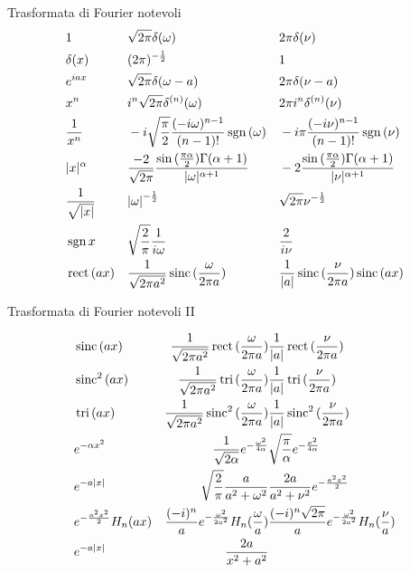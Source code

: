 \documentclass[asd-beamer.tex]{subfiles}
\begin{document}
\begin{wordonframe}{Trasformata di Fourier notevoli}
\begin{align*}
& 1 & &\sqrt{2\pi}\delta(\omega) & &2\pi\delta(\nu)\\
& \delta(x) & &(2\pi)^{-\frac{1}{2}} & &1\\
& e^{iax} & &\sqrt{2\pi}\delta(\omega-a) & &2\pi\delta(\nu-a)\\
& x^n & &i^n\sqrt{2\pi}\delta^{(n)}(\omega) & &2\pi i^n\delta^{(n)}(\nu)\\
& \frac{1}{x^n} & &-i\sqrt{\frac{\pi}{2}}\frac{(-i\omega)^{n-1}}{(n-1)!}\operatorname{sgn}{(\omega)} & &-i\pi\frac{(-i\nu)^{n-1}}{(n-1)!}\operatorname{sgn}{(\nu)}\\
& |x|^{\alpha} & &\frac{-2}{\sqrt{2\pi}}\frac{\sin{(\frac{\pi\alpha}{2})}\Gamma(\alpha+1)}{|\omega|^{\alpha+1}} & &-2\frac{\sin{(\frac{\pi\alpha}{2})}\Gamma(\alpha+1)}{|\nu|^{\alpha+1}}\\
& \frac{1}{\sqrt{|x|}} & &{|\omega|}^{-\frac{1}{2}} & &\sqrt{2\pi}\nu^{-\frac{1}{2}}\\
& \operatorname{sgn}{x} & &\sqrt{\frac{2}{\pi}}\frac{1}{i\omega} & &\frac{2}{i\nu}\\
& \operatorname{rect}{(ax)} & &\frac{1}{\sqrt{2\pi a^2}}\operatorname{sinc}{(\frac{\omega}{2\pi a})} & &\frac{1}{|a|}\operatorname{sinc}{(\frac{\nu}{2\pi a})}\operatorname{sinc}{(ax)}\\
\end{align*}

\end{wordonframe}

\begin{wordonframe}{Trasformata di Fourier notevoli II}

\begin{align*}
&\operatorname{sinc}{(ax)} & \frac{1}{\sqrt{2\pi a^2}}\operatorname{rect}{(\frac{\omega}{2\pi a})} &  \frac{1}{|a|}\operatorname{rect}{(\frac{\nu}{2\pi a})}\\
&\operatorname{sinc}^2{(ax)} & \frac{1}{\sqrt{2\pi a^2}}\operatorname{tri}{(\frac{\omega}{2\pi a})} &  \frac{1}{|a|}\operatorname{tri}{(\frac{\nu}{2\pi a})}\\
&\operatorname{tri}{(ax)} & \frac{1}{\sqrt{2\pi a^2}}\operatorname{sinc}^2{(\frac{\omega}{2\pi a})} &  \frac{1}{|a|}\operatorname{sinc}^2{(\frac{\nu}{2\pi a})}\\
&e^{-\alpha x^2} & \frac{1}{\sqrt{2\alpha}}e^{-\frac{\omega^2}{4\alpha}} & \sqrt{\frac{\pi}{\alpha}}e^{-\frac{\nu^2}{4\alpha}}\\
&e^{-a|x|} & \sqrt{\frac{2}{\pi}}\frac{a}{a^2+\omega^2} & \frac{2a}{a^2+\nu^2}e^{-\frac{a^2x^2}{2}}\\
&e^{-\frac{a^2x^2}{2}}H_n(ax) & \frac{(-i)^n}{a}e^{-\frac{\omega^2}{2a^2}}H_n(\frac{\omega}{a}) & \frac{(-i)^n\sqrt{2\pi}}{a}e^{-\frac{\omega^2}{2a^2}}H_n(\frac{\nu}{a})\\
&e^{-a|x|} & \frac{2a}{x^2+a^2}
\end{align*}
\end{wordonframe}
\end{document}
